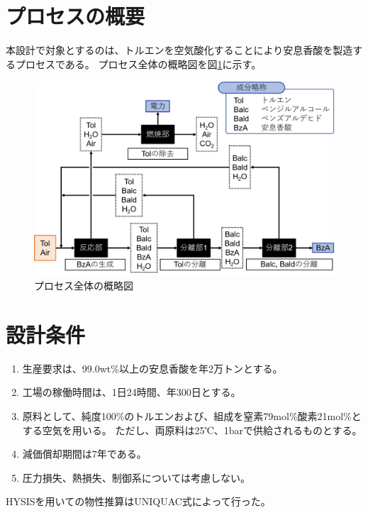 \documentclass[a4j]{jsreport}
\begin{document}
\section{プロセスの概要}
本設計で対象とするのは、トルエンを空気酸化することにより安息香酸を製造するプロセスである。
プロセス全体の概略図を図\ref{プロセス全体のの概略図}に示す。
\begin{figure}[h]
    \begin{center}
        \includegraphics[scale=0.6]{processOutline.png}
        \caption{プロセス全体の概略図}
        \label{プロセス全体のの概略図}
    \end{center}
\end{figure}

\section{設計条件}
\begin{enumerate}
    \item 生産要求は、99.0wt\%以上の安息香酸を年2万トンとする。\\
    \item 工場の稼働時間は、1日24時間、年300日とする。\\
    \item 原料として、純度100\%のトルエンおよび、組成を窒素79mol\%酸素21mol\%とする空気を用いる。
            ただし、両原料は25℃、1barで供給されるものとする。\\
    \item 減価償却期間は7年である。\\
    \item 圧力損失、熱損失、制御系については考慮しない。
\end{enumerate}
HYSISを用いての物性推算はUNIQUAC式によって行った。
\end{document}
